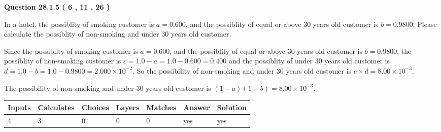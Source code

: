 \documentclass[12pt]{article}
\begin{document}
   
  
\vspace{0.2in}
  
{\textbf{\Large{Question
28.1.5 
 (           6 ,          11 ,          26 )
}}}
  
  
In a hotel, the possiblity of  %
smoking customer is
$a =  %
0.600$, and the possiblity of  %
equal or above 30 years old customer is $ b =  %
0.9800$.
Please calculate the possiblity of  %
 non-smoking and  %
under 30 years old customer.
 
 
 
\noindent{}
 
 

Since the possiblity of  %
smoking customer is $ a =  %
0.600 $,
and the possiblity of  %
equal or above 30 years old customer is $ b =  %
0.9800 $,
the possiblity of  %
non-smoking customer is $ c = 1.0 - a = 1.0 -
0.600
=  %
0.400 $ and the possiblity of  %
under 30 years old
customer is $ d = 1.0 - b = 1.0 -  %
0.9800 =  %
2.000 \times 10^{-2}  $.
So the possibility of  %
 non-smoking and  %
under 30 years old
customer is $ c \times d =  %
8.00 \times 10^{-3} $.
 
 
 
\noindent{}
 
 

 
 
 
\noindent{}
 
 

The possibility of  %
 non-smoking and  %
under 30 years old
customer is $ (1-a)(1-b) =  %
8.00 \times 10^{-3} $.
 
 
\noindent{}
 
 

 
\vspace{0.3in}
   
   
   
   
\noindent\begin{tabular}{|l|l|l|l|l|l|l|}
 \hline
Inputs & Calculates & Choices & Layers & Matches & Answer & Solution \\ \hline
           4  & 
           3  & 
           0
  & 
           0  & 
           0  & 
  yes & 
  yes 
  \\ \hline
 \end{tabular}
   
\end{document}
